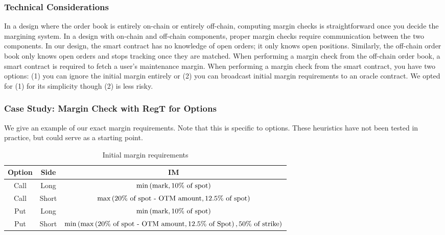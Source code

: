 \documentclass{article}
\begin{document}
\subsubsection{Technical Considerations}

In a design where the order book is entirely on-chain or entirely off-chain, computing margin checks is straightforward once you decide the margining system. In a design with on-chain and off-chain components, proper margin checks require communication between the two components. In our design, the smart contract has no knowledge of open orders; it only knows open positions. Similarly, the off-chain order book only knows open orders and stops tracking once they are matched. 
When performing a margin check from the off-chain order book, a smart contract is required to fetch a user's maintenance margin. When performing a margin check from the smart contract, you have two options: (1) you can ignore the initial margin entirely or (2) you can broadcast initial margin requirements to an oracle contract. We opted for (1) for its simplicity though (2) is less risky.

\subsubsection{Case Study: Margin Check with RegT for Options}

We give an example of our exact margin requirements. Note that this is specific to options. These heuristics have not been tested in practice, but could serve as a starting point.

\begin{table}[h!]
    \centering
    \begin{tabular}{c|c|c}
         \textbf{Option} & \textbf{Side} & \textbf{IM} \\
         \hline
         Call & Long & $\min\left(\textup{mark}, \textup{10\% of spot}\right)$ \\ 
         Call & Short & $\max\left(\textup{20\% of spot - OTM amount}, \textup{12.5\% of spot}\right)$  \\
         Put & Long & $\min\left(\textup{mark}, \textup{10\% of spot}\right)$ \\ 
         Put & Short & $\min\left( \max\left( \textup{20\% of spot - OTM amount}, \textup{12.5\% of Spot} \right), \textup{50\% of strike} \right)$ \\ 
    \end{tabular}
    \caption{Initial margin requirements}
    \label{tab:my_label}
\end{table}
\end{document}
